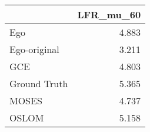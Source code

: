 \begin{tabular}{lr}
\toprule
{} & LFR_mu_60 \\
\midrule
Ego          &     4.883 \\
Ego-original &     3.211 \\
GCE          &     4.803 \\
Ground Truth &     5.365 \\
MOSES        &     4.737 \\
OSLOM        &     5.158 \\
\bottomrule
\end{tabular}
